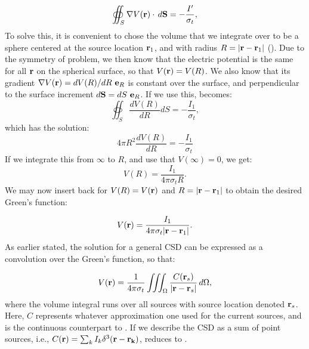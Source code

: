 \begin{equation}
\oiint_{S} \nabla V({\bf r}) \cdot \, d{\bf S}  = - \frac{I'}{\sigma_t},
\label{eq:VC:berit1}
\end{equation}
To solve this, it is convenient to chose the volume that we integrate over to be a sphere centered at the source location ${\bf r}_1$, and with radius $R = |{\bf r}-{\bf r}_1|$ (). Due to the symmetry of problem, we then know that the electric potential is the same for all ${\bf r}$ on the spherical surface, so that $V({\bf r}) = V(R)$. We also know that its gradient $\nabla V({\bf r}) = d V(R)/dR ~{\bf e}_R$ is constant over the surface, and perpendicular to the surface increment $d{\bf S} = dS {~\bf e}_R$. If we use this,  becomes:
\begin{equation}
\oiint_{S} \frac{d V(R)}{dR} d{S}  = - \frac{I_1}{\sigma_t},
\label{eq:VC:berit1ogenhalv}
\end{equation}
which has the solution:
\begin{equation}
4\pi R^2 \frac{d V(R)}{dR} = -\frac{I_1}{\sigma_t}
\label{eq:VC:berit2}
\end{equation}
If we integrate this from $\infty$ to $R$, and use that $V(\infty) = 0$, we get:
\begin{equation}
V(R) =  \frac{I_1}{4\pi \sigma_t R}.
\label{eq:VC:berit3}
\end{equation}
We may now insert back for $V(R)= V({\bf r})$ and $R = |{\bf r}-{\bf r}_1|$ to obtain the desired Green's function:

\begin{equation}
V({\bf r})= \frac{I_1}{4\pi \sigma_t |{\bf r}-{\bf r}_1|}.
\label{eq:VC:berit4}
\end{equation}
As earlier stated, the solution for a general CSD can be expressed as a convolution over the Green's function, so that:

\begin{equation}
V({\bf r}) = \frac{1}{4\pi \sigma_t}\iiint_{\Omega} \frac{C({\bf r}_s)}{|{\bf r}-{\bf r}_s|} \,d\Omega,
\label{eq:VC:csds}
\end{equation}
where the volume integral runs over all sources with source location denoted ${\bf r}_s$. Here, $C$ represents whatever approximation one used for the current sources, and  is the continuous counterpart to . If we describe the CSD as a sum of point sources, i.e.,  $C({\bf r}) = \sum_k I_k \delta^3({\bf r} - {\bf r_k})$,   reduces to .



